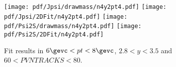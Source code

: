 \begin{figure}[H]
\begin{center}
\texttt{[image: pdf/Jpsi/drawmass/n4y2pt4.pdf]}
\texttt{[image: pdf/Jpsi/2DFit/n4y2pt4.pdf]}
\vspace*{-0.5cm}
\texttt{[image: pdf/Psi2S/drawmass/n4y2pt4.pdf]}
\texttt{[image: pdf/Psi2S/2DFit/n4y2pt4.pdf]}
\vspace*{-0.5cm}
\end{center}
\caption{Fit results in $6\gevc<pt<8\gevc$, $2.8<y<3.5$ and $60<PVNTRACKS<80$.}
\label{Fitn4y2pt4}
\end{figure}
